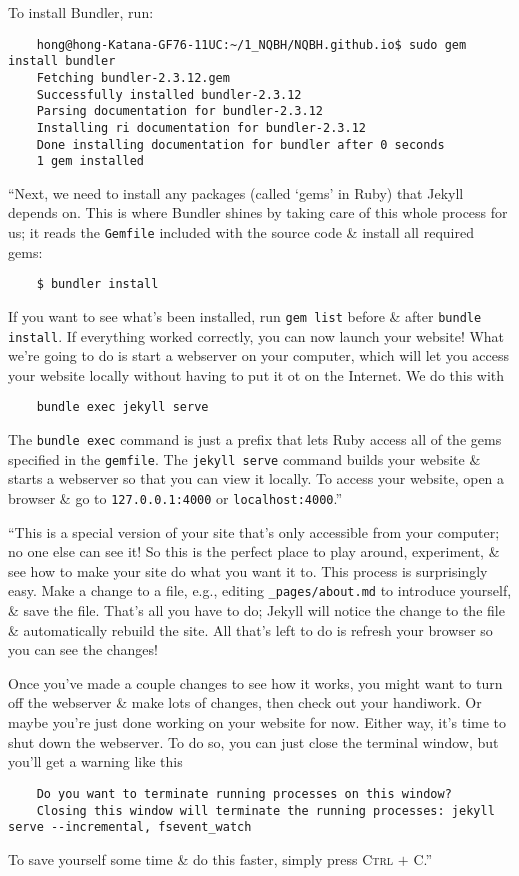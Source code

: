 \documentclass{article}
\numberwithin{equation}{section}
\begin{document}
To install Bundler, run:
\begin{verbatim}
	hong@hong-Katana-GF76-11UC:~/1_NQBH/NQBH.github.io$ sudo gem install bundler
	Fetching bundler-2.3.12.gem
	Successfully installed bundler-2.3.12
	Parsing documentation for bundler-2.3.12
	Installing ri documentation for bundler-2.3.12
	Done installing documentation for bundler after 0 seconds
	1 gem installed
\end{verbatim}
``Next, we need to install any packages (called `gems' in Ruby) that Jekyll depends on. This is where Bundler shines by taking care of this whole process for us; it reads the \texttt{Gemfile} included with the source code \& install all required gems:
\begin{verbatim}
	$ bundler install
\end{verbatim}
If you want to see what's been installed, run \texttt{gem list} before \& after \texttt{bundle install}. If everything worked correctly, you can now launch your website! What we're going to do is start a webserver on your computer, which will let you access your website locally without having to put it ot on the Internet. We do this with
\begin{verbatim}
	bundle exec jekyll serve
\end{verbatim}
The \texttt{bundle exec} command is just a prefix that lets Ruby access all of the gems specified in the \texttt{gemfile}. The \texttt{jekyll serve} command builds your website \& starts a webserver so that you can view it locally. To access your website, open a browser \& go to \texttt{127.0.0.1:4000} or \texttt{localhost:4000}.''

``This is a special version of your site that's only accessible from your computer; no one else can see it! So this is the perfect place to play around, experiment, \& see how to make your site do what you want it to. This process is surprisingly easy. Make a change to a file, e.g., editing \verb|_pages/about.md| to introduce yourself, \& save the file. That's all you have to do; Jekyll will notice the change to the file \& automatically rebuild the site. All that's left to do is refresh your browser so you can see the changes!

Once you've made a couple changes to see how it works, you might want to turn off the webserver \& make lots of changes, then check out your handiwork. Or maybe you're just done working on your website for now. Either way, it's time to shut down the webserver. To do so, you can just close the terminal window, but you'll get a warning like this
\begin{verbatim}
	Do you want to terminate running processes on this window?
	Closing this window will terminate the running processes: jekyll serve --incremental, fsevent_watch
\end{verbatim}
To save yourself some time \& do this faster, simply press \textsc{Ctrl} $+$ \textsc{C}.''
\end{document}

